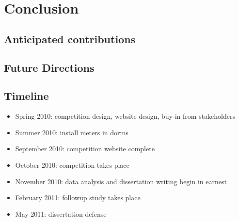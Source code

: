 \chapter{Conclusion}

\section{Anticipated contributions}

\section{Future Directions}

\section{Timeline}

\begin{itemize}
\item Spring 2010: competition design, website design, buy-in from stakeholders
\item Summer 2010: install meters in dorms
\item September 2010: competition website complete
\item October 2010: competition takes place
\item November 2010: data analysis and dissertation writing begin in earnest
\item February 2011: followup study takes place
\item May 2011: dissertation defense
\end{itemize}
